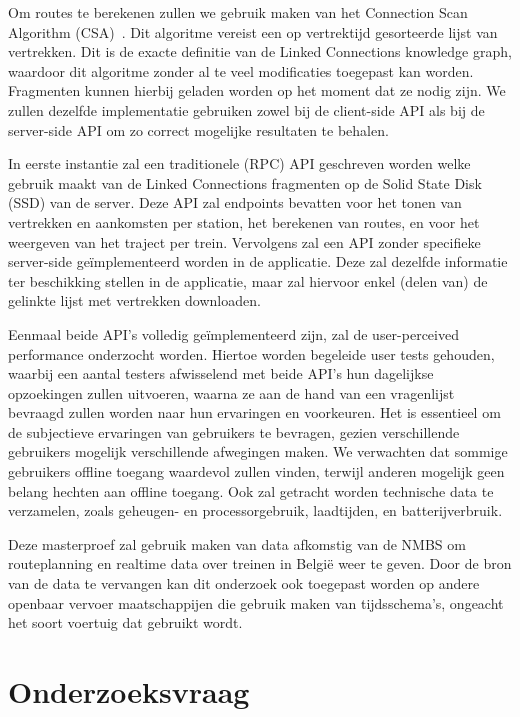 Om routes te berekenen zullen we gebruik maken van het Connection Scan Algorithm (CSA)~\citep{strasser13,strasser14,strasser17}. Dit algoritme vereist een op vertrektijd gesorteerde lijst van vertrekken. Dit is de exacte definitie van de Linked Connections knowledge graph, waardoor dit algoritme zonder al te veel modificaties toegepast kan worden. Fragmenten kunnen hierbij geladen worden op het moment dat ze nodig zijn. We zullen dezelfde implementatie gebruiken zowel bij de client-side API als bij de server-side API om zo correct mogelijke resultaten te behalen. 

In eerste instantie zal een traditionele (RPC) API geschreven worden welke gebruik maakt van de Linked Connections fragmenten op de Solid State Disk (SSD) van de server. Deze API zal endpoints bevatten voor het tonen van vertrekken en aankomsten per station, het berekenen van routes, en voor het weergeven van het traject per trein. 
Vervolgens zal een API zonder specifieke server-side geïmplementeerd worden in de applicatie. Deze zal dezelfde informatie ter beschikking stellen in de applicatie, maar zal hiervoor enkel (delen van) de gelinkte lijst met vertrekken downloaden. 

Eenmaal beide API's volledig geïmplementeerd zijn, zal de user-perceived performance onderzocht worden. Hiertoe worden begeleide user tests gehouden, waarbij een aantal testers afwisselend met beide API's hun dagelijkse opzoekingen zullen uitvoeren, waarna ze aan de hand van een vragenlijst bevraagd zullen worden naar hun ervaringen en voorkeuren. Het is essentieel om de subjectieve ervaringen van gebruikers te bevragen, gezien verschillende gebruikers mogelijk verschillende afwegingen maken. We verwachten dat sommige gebruikers offline toegang waardevol zullen vinden, terwijl anderen mogelijk geen belang hechten aan offline toegang. Ook zal getracht worden technische data te verzamelen, zoals geheugen- en processorgebruik, laadtijden, en batterijverbruik. 

Deze masterproef zal gebruik maken van data afkomstig van de NMBS om routeplanning en realtime data over treinen in België weer te geven. Door de bron van de data te vervangen kan dit onderzoek ook toegepast worden op andere openbaar vervoer maatschappijen die gebruik maken van tijdsschema's, ongeacht het soort voertuig dat gebruikt wordt.

\section{Onderzoeksvraag}
 \label{sec:onderzoeksvraag}
 
